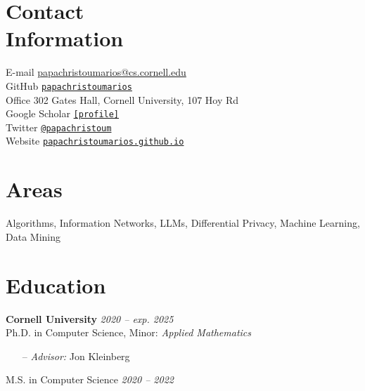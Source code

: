 \documentclass[margin]{res}
\newcommand{\field}[2]{\noindent \textbf{#1} \hfill #2 \\}
\newcommand{\specialurl}[2]{\href {#2} {\texttt{[#1]}}}
\begin{document}

\begin{resume}

\section{Contact \\ Information} 
E-mail \hfill \url{papachristoumarios@cs.cornell.edu} \\
GitHub \hfill \href{http://github.com/papachristoumarios}{\nolinkurl{papachristoumarios}} \\
Office \hfill 302 Gates Hall, Cornell University, 107 Hoy Rd \\
Google Scholar \hfill \specialurl{profile}{https://scholar.google.gr/citations?user=T12JO3MAAAAJ&hl=en} \\
Twitter \hfill \href{https://twitter.com/papachristoum}{\nolinkurl {@papachristoum}} \\
Website \hfill \href{https://papachristoumarios.github.io}{\nolinkurl {papachristoumarios.github.io}}

\section{Areas} Algorithms, Information Networks, LLMs, Differential Privacy, Machine Learning, Data Mining

\section{Education}
\field {Cornell University} {\emph{2020 -- exp. 2025}}
Ph.D. in Computer Science, Minor: \emph{Applied Mathematics}
\begin{itemize}[nosep]    
\item[--] \emph{Advisor:} Jon Kleinberg
\end{itemize} 

M.S. in Computer Science \hfill {\emph{2020 -- 2022}}
 

\end{resume}
\end{document}
